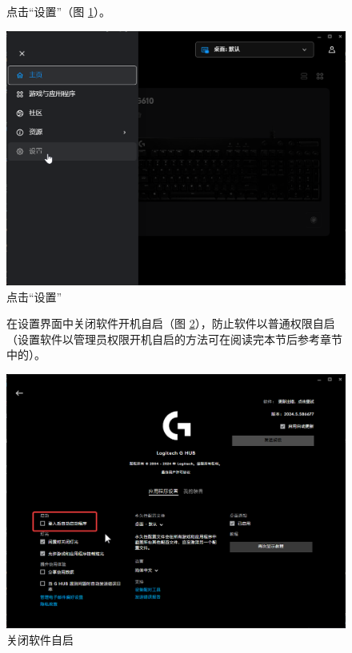 \begin{figure}[H]
    \Centering
    \parbox[l]{\textwidth}{点击“设置”（图 \ref{ch0fig-lghub-setting}）。}
    \includegraphics[width=\textwidth]{assets/intro/lghub_setting.png}
    \caption{点击“设置”}
    \label{ch0fig-lghub-setting}
\end{figure}

\begin{figure}[H]
    \Centering
    \parbox[l]{\textwidth}{在设置界面中关闭软件开机自启（图 \ref{ch0fig-disable-login-start}），防止软件以普通权限自启
    （设置软件以管理员权限开机自启的方法可在阅读完本节后参考章节中的）。}
    \includegraphics[width=\textwidth]{assets/intro/disable_login_start.png}
    \caption{关闭软件自启}
    \label{ch0fig-disable-login-start}
\end{figure}

